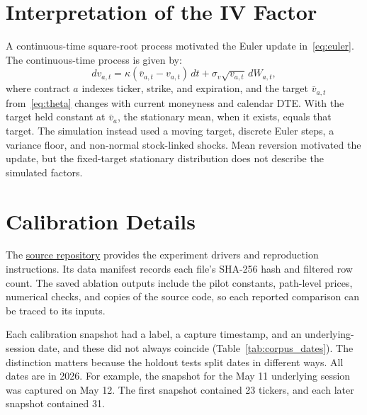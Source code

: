 \section{Interpretation of the IV Factor}\label{sec:supp_sigma_decomp}

A continuous-time square-root process motivated the Euler update in~\eqref{eq:euler}. The continuous-time process is given by:
\begin{equation}\label{eq:level_sde}
    dv_{a,t}=\kappa(\bar v_{a,t}-v_{a,t})\,dt
    +\sigma_v\sqrt{v_{a,t}}\,dW_{a,t},
\end{equation}
where contract $a$ indexes ticker, strike, and expiration, and the target $\bar v_{a,t}$ from~\eqref{eq:theta} changes with current moneyness and calendar DTE. With the target held constant at $\bar v_a$, the stationary mean, when it exists, equals that target. The simulation instead used a moving target, discrete Euler steps, a variance floor, and non-normal stock-linked shocks. Mean reversion motivated the update, but the fixed-target stationary distribution does not describe the simulated factors.

\section{Calibration Details}\label{sec:supp_sector_nn}

The \href{https://github.com/varnerlab/heston_implied_volatility_model}{source repository} provides the experiment drivers and reproduction instructions. Its data manifest records each file's SHA-256 hash and filtered row count. The saved ablation outputs include the pilot constants, path-level prices, numerical checks, and copies of the source code, so each reported comparison can be traced to its inputs.

Each calibration snapshot had a label, a capture timestamp, and an underlying-session date, and these did not always coincide (Table~\ref{tab:corpus_dates}). The distinction matters because the holdout tests split dates in different ways. All dates are in 2026. For example, the snapshot for the May 11 underlying session was captured on May 12. The first snapshot contained 23 tickers, and each later snapshot contained 31.
\begin{table}[H]
\centering
\caption{Labels, capture dates, and underlying-session dates of the calibration snapshots. The April earnings holdout split dates by snapshot label. The May 11 single-date holdout used the underlying-session date. The first snapshot is labeled April 14, but its underlying close was from April 13. The Rows column counts filtered observations from each snapshot.}\label{tab:corpus_dates}

\end{table}
\FloatBarrier

